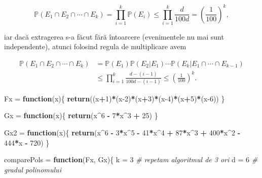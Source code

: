 \documentclass[]{article}
\newenvironment{Shaded}{\begin{snugshade}}{\end{snugshade}}
\newcommand{\CommentTok}[1]{\textcolor[rgb]{0.56,0.35,0.01}{\textit{#1}}}
\newcommand{\ControlFlowTok}[1]{\textcolor[rgb]{0.13,0.29,0.53}{\textbf{#1}}}
\newcommand{\DecValTok}[1]{\textcolor[rgb]{0.00,0.00,0.81}{#1}}
\newcommand{\KeywordTok}[1]{\textcolor[rgb]{0.13,0.29,0.53}{\textbf{#1}}}
\newcommand{\NormalTok}[1]{#1}
\newcommand{\OperatorTok}[1]{\textcolor[rgb]{0.81,0.36,0.00}{\textbf{#1}}}
\newcommand{\StringTok}[1]{\textcolor[rgb]{0.31,0.60,0.02}{#1}}
\begin{document}
\[
  \mathbb{P}(E_1\cap E_2\cap \cdots\cap E_k) = \prod_{i=1}^{k}\mathbb{P}(E_i)\leq\prod_{i=1}^{k}\frac{d}{100d} = \left(\frac{1}{100}\right)^k,
\]

iar dacă extragerea s-a făcut fără întoarcere (evenimentele nu mai sunt
independente), atunci folosind regula de multiplicare avem

\begin{align*}
  \mathbb{P}(E_1\cap E_2\cap \cdots\cap E_k) &= \mathbb{P}(E_1)\mathbb{P}(E_2|E_1)\cdots\mathbb{P}(E_k|E_1\cap\cdots\cap E_{k-1})\\
                    &\leq \prod_{i=1}^{k}\frac{d - (i-1)}{100d - (i-1)} \leq \left(\frac{1}{100}\right)^k.
\end{align*}

\begin{Shaded}
\begin{Highlighting}[]
\NormalTok{Fx =}\StringTok{ }\ControlFlowTok{function}\NormalTok{(x)\{}
  \KeywordTok{return}\NormalTok{((x}\OperatorTok{+}\DecValTok{1}\NormalTok{)}\OperatorTok{*}\NormalTok{(x}\DecValTok{-2}\NormalTok{)}\OperatorTok{*}\NormalTok{(x}\OperatorTok{+}\DecValTok{3}\NormalTok{)}\OperatorTok{*}\NormalTok{(x}\DecValTok{-4}\NormalTok{)}\OperatorTok{*}\NormalTok{(x}\OperatorTok{+}\DecValTok{5}\NormalTok{)}\OperatorTok{*}\NormalTok{(x}\DecValTok{-6}\NormalTok{))}
\NormalTok{\}}

\NormalTok{Gx =}\StringTok{ }\ControlFlowTok{function}\NormalTok{(x)\{}
  \KeywordTok{return}\NormalTok{(x}\OperatorTok{^}\DecValTok{6} \OperatorTok{-}\StringTok{ }\DecValTok{7}\OperatorTok{*}\NormalTok{x}\OperatorTok{^}\DecValTok{3} \OperatorTok{+}\StringTok{ }\DecValTok{25}\NormalTok{)}
\NormalTok{\}}

\NormalTok{Gx2 =}\StringTok{ }\ControlFlowTok{function}\NormalTok{(x)\{}
  \KeywordTok{return}\NormalTok{(x}\OperatorTok{^}\DecValTok{6} \OperatorTok{-}\StringTok{ }\DecValTok{3}\OperatorTok{*}\NormalTok{x}\OperatorTok{^}\DecValTok{5} \OperatorTok{-}\StringTok{ }\DecValTok{41}\OperatorTok{*}\NormalTok{x}\OperatorTok{^}\DecValTok{4} \OperatorTok{+}\StringTok{ }\DecValTok{87}\OperatorTok{*}\NormalTok{x}\OperatorTok{^}\DecValTok{3} \OperatorTok{+}\StringTok{ }\DecValTok{400}\OperatorTok{*}\NormalTok{x}\OperatorTok{^}\DecValTok{2} \OperatorTok{-}\StringTok{ }\DecValTok{444}\OperatorTok{*}\NormalTok{x }\OperatorTok{-}\StringTok{ }\DecValTok{720}\NormalTok{)}
\NormalTok{\}}

\NormalTok{comparePols =}\StringTok{ }\ControlFlowTok{function}\NormalTok{(Fx, Gx)\{}
\NormalTok{  k =}\StringTok{ }\DecValTok{3} \CommentTok{# repetam algoritmul de 3 ori}
\NormalTok{  d =}\StringTok{ }\DecValTok{6} \CommentTok{# gradul polinomului }
  

\end{Highlighting}
\end{Shaded}
\end{document}
